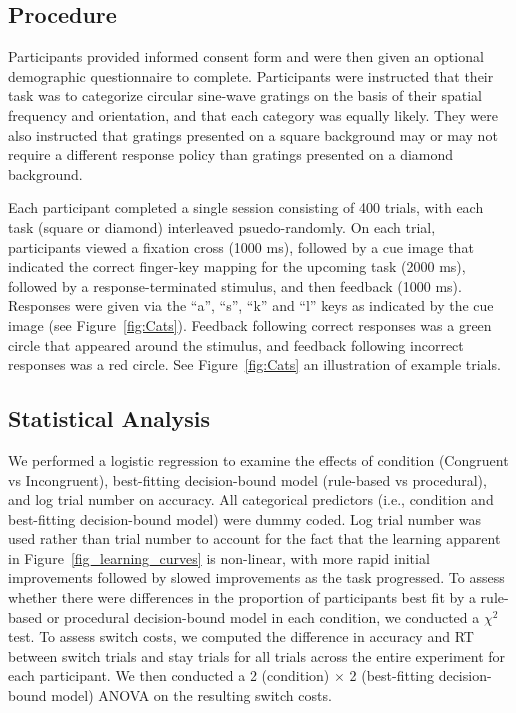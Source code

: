 \documentclass[doc, floatsintext]{apa7}
\begin{document}
\subsection{Procedure}
Participants provided informed consent form and were then given an optional
demographic questionnaire to complete. Participants were instructed that their task was to categorize circular sine-wave
gratings on the basis of their spatial frequency and orientation, and that each category was equally likely. They were also instructed that gratings presented on a square background may or may not require a different response policy than gratings presented on a diamond background. 

Each participant completed a single session consisting of
400 trials, with each task (square or diamond) interleaved
psuedo-randomly.   On each trial, participants viewed a
fixation cross (1000 ms), followed by a cue image that
indicated the correct finger-key mapping for the upcoming
task (2000 ms), followed by a response-terminated stimulus,
and then feedback (1000 ms).  Responses were given via the
``a'', ``s'', ``k'' and ``l'' keys as indicated by the cue
image (see Figure~\ref{fig:Cats}). Feedback
following correct responses was a green circle that appeared
around the stimulus, and feedback following incorrect
responses was a red circle. See
Figure~\ref{fig:Cats} an illustration of
example trials.

\subsection{Statistical Analysis}
We performed a logistic regression to examine the effects of condition (Congruent vs Incongruent), best-fitting decision-bound model (rule-based vs procedural), and log trial number on accuracy. All categorical predictors (i.e., condition and best-fitting decision-bound model) were dummy coded. Log trial number was used rather than trial number to account for the fact that the learning apparent in
Figure~\ref{fig_learning_curves} is non-linear, with more rapid initial improvements followed by slowed improvements as the task progressed. To assess whether there were differences in the proportion of participants best fit by a rule-based or procedural decision-bound model in each condition, we conducted a $\chi^2$ test. To assess switch costs, we computed the difference in accuracy and RT between
switch trials and stay trials for all trials across the
entire experiment for each participant. We then conducted a
2 (condition) $\times$ 2 (best-fitting decision-bound model) ANOVA
on the resulting switch costs.
\end{document}
